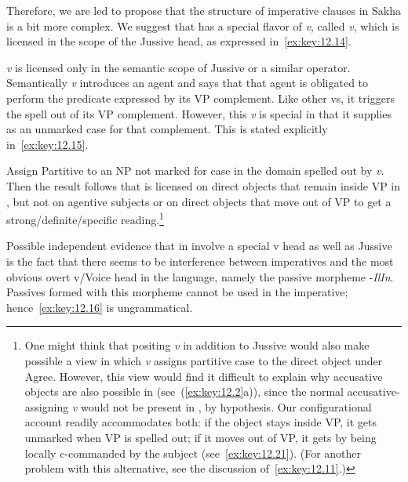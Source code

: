\documentclass[output=paper]{langsci/langscibook}
\begin{document}
Therefore, we are led to propose that the structure of imperative clauses in
Sakha is a bit more complex. We suggest that  has a special flavor
of \emph{v}, called \emph{v}\textsubscript{\Imp}, which is licensed in the scope of
the Jussive head, as expressed in~\eqref{ex:key:12.14}.

\ea\label{ex:key:12.14}
\emph{v}\textsubscript{\Imp} is licensed only in the semantic scope of Jussive or a similar operator.
\z
Semantically \emph{v}\textsubscript{\Imp} introduces an agent and says that that agent
is obligated to perform the predicate expressed by its VP complement. Like
other vs, it triggers the spell out of its VP complement. However, this \emph{v} is
special in that it supplies  as an unmarked case for that
complement. This is stated explicitly in~\eqref{ex:key:12.15}.

\ea\label{ex:key:12.15}
Assign Partitive to an NP not marked for case in the domain spelled out by \emph{v}\textsubscript{\Imp}.
\z
Then the result follows that  is licensed on direct objects
that remain inside VP in , but not on agentive subjects or on direct
objects that move out of VP to get a strong/definite/specific
reading.\footnote{One might think that positing \emph{v}\textsubscript{\Imp} in
    addition to Jussive would also make possible a view in which
    \emph{v}\textsubscript{\Imp} assigns partitive case to the direct object
    under Agree.  However, this view would find it difficult to explain why
    accusative objects are also possible in 
    (see~(\ref{ex:key:12.2}a)), since the normal accusative-assigning \emph{v}
    would not be present in , by hypothesis. Our
    configurational account readily accommodates both: if the object stays
    inside VP, it gets unmarked  when VP is spelled out; if
    it moves out of VP, it gets  by being locally c-commanded by
    the subject (see~\eqref{ex:key:12.21}). (For another problem with this
alternative, see the discussion of~\eqref{ex:key:12.11}.)}

Possible independent evidence that  in  involve a
special v head as well as Jussive is the fact that there seems to be
interference between imperatives and the most obvious overt v/Voice head in the
language, namely the passive morpheme -\emph{IlIn}. Passives formed with this
morpheme cannot be used in the imperative;
hence~\eqref{ex:key:12.16} is ungrammatical.\newpage
\end{document}
